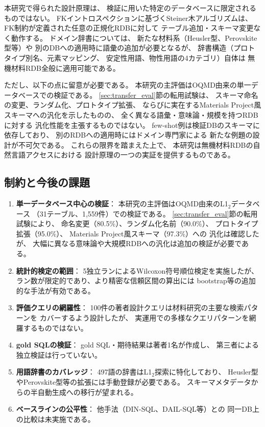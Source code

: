 \documentclass[5p,twocolumn]{elsarticle}
\begin{document}
本研究で得られた設計原理は、
検証に用いた特定のデータベースに限定されるものではない。
FKイントロスペクションに基づくSteiner木アルゴリズムは、
FK制約が定義された任意の正規化RDBに対して
テーブル追加・スキーマ変更なく動作する。
ドメイン辞書については、
新たな材料系（Heusler型、Perovskite型等）や
別のDBへの適用時に語彙の追加が必要となるが、
辞書構造（プロトタイプ別名、元素マッピング、
安定性用語、物性用語の4カテゴリ）自体は
無機材料RDB全般に適用可能である。

ただし、以下の点に留意が必要である。
本研究の主評価はOQMD由来の単一データベースでの検証である。
\ref{sec:transfer_eval}節の転用試験は、
スキーマ命名の変更、ランダム化、プロトタイプ拡張、
ならびに実在するMaterials Project風スキーマへの汎化を示したものの、
全く異なる語彙・意味論・規模を持つRDBに対する
汎化性能を主張するものではない。
few-shot例は検証DBのスキーマに依存しており、
別のRDBへの適用時にはドメイン専門家による
新たな例題の設計が不可欠である。
これらの限界を踏まえた上で、
本研究は無機材料RDBの自然言語アクセスにおける
設計原理の一つの実証を提供するものである。

\subsection{制約と今後の課題}

\begin{enumerate}
  \item \textbf{単一データベース中心の検証}：
    本研究の主評価はOQMD由来のL1$_2$データベース
    （31テーブル、1{,}559件）での検証である。
    \ref{sec:transfer_eval}節の転用試験により、
    命名変更（80.5\%）、ランダム化名前（90.0\%）、
    プロトタイプ拡張（95.0\%）、
    Materials Project風スキーマ（97.3\%）への
    汎化は確認したが、
    大幅に異なる意味論や大規模RDBへの汎化は追加の検証が必要である。
  \item \textbf{統計的検定の範囲}：
    5独立ランによるWilcoxon符号順位検定を実施したが、
    ラン数が限定的であり、より精密な信頼区間の算出には
    bootstrap等の追加的な手法が有効である。
  \item \textbf{評価クエリの網羅性}：
    100件の著者設計クエリは材料研究の主要な検索パターンを
    カバーするよう設計したが、
    実運用での多様なクエリパターンを網羅するものではない。
  \item \textbf{gold SQLの検証}：
    gold SQL・期待結果は著者1名が作成し、
    第三者による独立検証は行っていない。
  \item \textbf{用語辞書のカバレッジ}：
    497語の辞書はL1$_2$探索に特化しており、
    Heusler型やPerovskite型等の拡張には手動登録が必要である。
    スキーマメタデータからの半自動生成への移行が望まれる。
  \item \textbf{ベースラインの公平性}：
    他手法（DIN-SQL、DAIL-SQL等）との
    同一DB上の比較は未実施である。
\end{enumerate}
\end{document}
